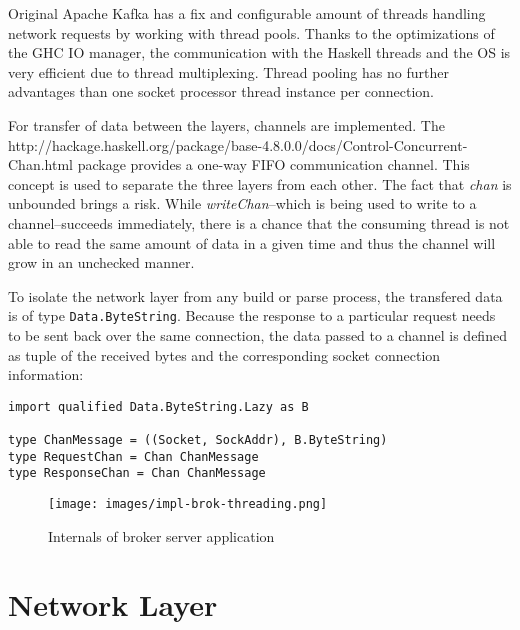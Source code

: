 Original Apache Kafka has a fix and configurable amount of threads handling
network requests by working with thread pools. Thanks to the optimizations of
the GHC IO manager, the communication with the Haskell threads and the OS is
very efficient due to thread multiplexing. Thread pooling has no further
advantages than one socket processor thread instance per connection. 

For transfer of data between the layers, channels are implemented. The
{http://hackage.haskell.org/package/base-4.8.0.0/docs/Control-Concurrent-Chan.html}
package provides a one-way FIFO communication channel. This concept is used to
separate the three layers from each other. The fact that \textit{chan} is
unbounded brings a risk. While \textit{writeChan}--which is being used to write
to a channel--succeeds immediately, there is a chance that the consuming thread
is not able to read the same amount of data in a given time and thus the channel
will grow in an unchecked manner.  \cite{o2008real}

To isolate the network layer from any build or parse process, the transfered
data is of type \lstinline{Data.ByteString}. Because the response to a
particular request needs to be sent back over the same connection, the data
passed to a channel is defined as tuple of the received bytes and the
corresponding socket connection information:

\begin{lstlisting}[caption={Initialize channels for threading}]
import qualified Data.ByteString.Lazy as B

type ChanMessage = ((Socket, SockAddr), B.ByteString)
type RequestChan = Chan ChanMessage
type ResponseChan = Chan ChanMessage
\end{lstlisting}

\begin{figure}[H]
    \centering
    \texttt{[image: images/impl-brok-threading.png]}
    \caption{Internals of broker server application}
    \label{fig:impl-brok-threading}
\end{figure}

\newpage
\section{Network Layer}
\label{sec:broker-network}

